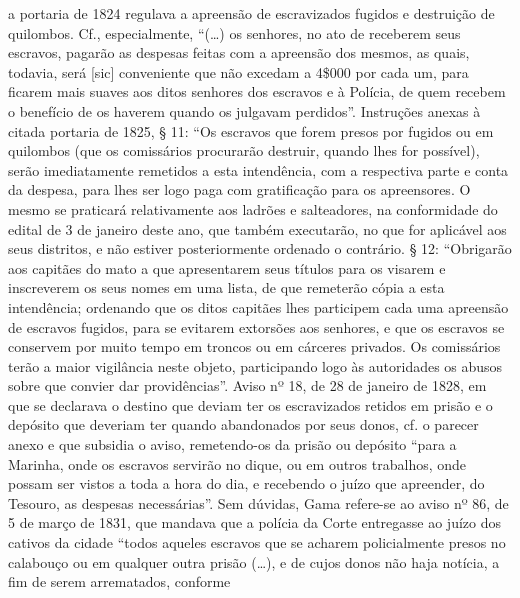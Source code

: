{  a portaria de 1824 regulava a apreensão de escravizados fugidos e
  destruição de quilombos. Cf., especialmente, ``(\ldots{}) os senhores, no ato
  de receberem seus escravos, pagarão as despesas feitas com a apreensão
  dos mesmos, as quais, todavia, será {[}sic{]} conveniente que não
  excedam a 4\$000 por cada um, para ficarem mais suaves aos ditos
  senhores dos escravos e à Polícia, de quem recebem o benefício de os
  haverem quando os julgavam perdidos''. Instruções anexas à citada
  portaria de 1825, § 11: ``Os escravos que forem presos por fugidos ou
  em quilombos (que os comissários procurarão destruir, quando lhes for
  possível), serão imediatamente remetidos a esta intendência, com a
  respectiva parte e conta da despesa, para lhes ser logo paga com
  gratificação para os apreensores. O mesmo se praticará relativamente
  aos ladrões e salteadores, na conformidade do edital de 3 de janeiro
  deste ano, que também executarão, no que for aplicável aos seus
  distritos, e não estiver posteriormente ordenado o contrário. § 12:
  ``Obrigarão aos capitães do mato a que apresentarem seus títulos para
  os visarem e inscreverem os seus nomes em uma lista, de que remeterão
  cópia a esta intendência; ordenando que os ditos capitães lhes
  participem cada uma apreensão de escravos fugidos, para se evitarem
  extorsões aos senhores, e que os escravos se conservem por muito tempo
  em troncos ou em cárceres privados. Os comissários terão a maior
  vigilância neste objeto, participando logo às autoridades os abusos
  sobre que convier dar providências''. Aviso nº 18, de 28 de janeiro de 1828, em
  que se declarava o destino que deviam ter os escravizados retidos em
  prisão e o depósito que deveriam ter quando abandonados por seus
  donos, cf. o parecer anexo e que subsidia o aviso, remetendo-os da
  prisão ou depósito ``para a Marinha, onde os escravos servirão no
  dique, ou em outros trabalhos, onde possam ser vistos a toda a hora do
  dia, e recebendo o juízo que apreender, do Tesouro, as despesas
  necessárias''. Sem dúvidas, Gama refere-se ao aviso nº 86, de
  5 de março de 1831, que mandava que a polícia da Corte entregasse ao juízo dos
  cativos da cidade ``todos aqueles escravos que se acharem
  policialmente presos no calabouço ou em qualquer outra prisão (\ldots{}), e
  de cujos donos não haja notícia, a fim de serem arrematados, conforme
}
